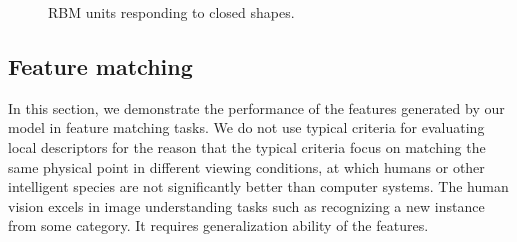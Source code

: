 \documentclass[twocolumn]{article}
\begin{document}
\begin{figure}
\centering
{}\hfil
{}\hfil
{}
\caption{RBM units responding to closed shapes.}
\label{fig:10}
\end{figure}

\subsection{Feature matching}

In this section, we demonstrate the performance of the features generated by our model in feature matching tasks.
We do not use typical criteria for evaluating local descriptors \cite{mikolajczyk2005}
for the reason that the typical criteria focus on matching the same physical point in different viewing conditions,
at which humans or other intelligent species are not significantly better than computer systems.
The human vision excels in image understanding tasks such as recognizing a new instance from some category.
It requires generalization ability of the features.
\end{document}
